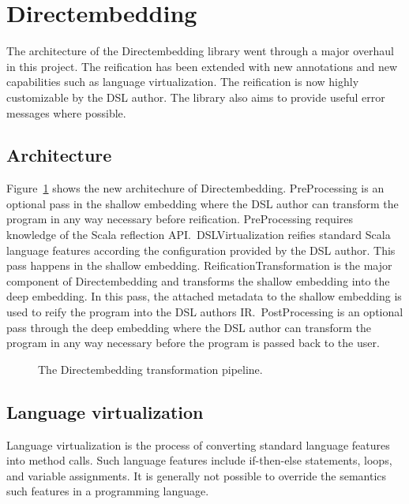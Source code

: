 \section{Directembedding} %
\label{sec:Directembedding}
The architecture of the Directembedding library went through a major overhaul in this project.
The reification has been extended with new annotations and new capabilities such as language virtualization.
The reification is now highly customizable by the DSL author.
The library also aims to provide useful error messages where possible.

\subsection{Architecture} %
\label{sub:Architecture}
Figure~\ref{fig:pipeline} shows the new architechure of Directembedding.
PreProcessing is an optional pass in the shallow embedding where the DSL author can transform the program in any way necessary before reification.
PreProcessing requires knowledge of the Scala reflection API.\
DSLVirtualization reifies standard Scala language features according the configuration provided by the DSL author.
This pass happens in the shallow embedding.
ReificationTransformation is the major component of Directembedding and transforms the shallow embedding into the deep embedding.
In this pass, the attached metadata to the shallow embedding is used to reify the program into the DSL authors IR.\
PostProcessing is an optional pass through the deep embedding where the DSL author can transform the program in any way necessary before the program is passed back to the user.

\begin{figure}
    \centering
    \caption{The Directembedding transformation pipeline.}\label{fig:pipeline}
\end{figure}

\subsection{Language virtualization} %
\label{sub:LanguageVirtualization}
Language virtualization is the process of converting standard language features into method calls.
Such language features include if-then-else statements, loops, and variable assignments.
It is generally not possible to override the semantics such features in a programming language.

